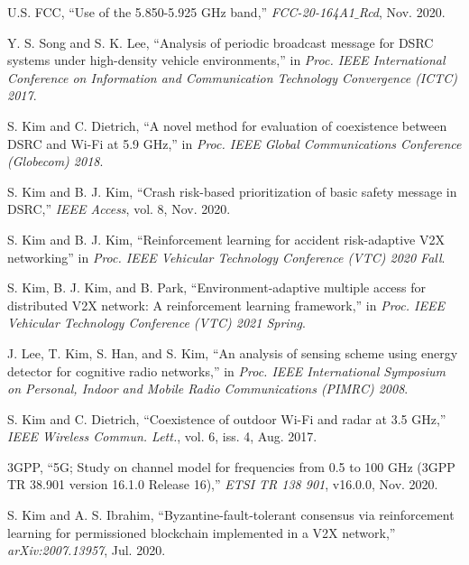 \documentclass[journal]{IEEEtran}
\begin{document}
\begin{thebibliography}{99}

\setlength{\parskip}{0.5em}
 U.S. FCC, ``Use of the 5.850-5.925 GHz band,'' \textit{FCC-20-164A1$\_$Rcd}, Nov. 2020.

 Y. S. Song and S. K. Lee, ``Analysis of periodic broadcast message for DSRC systems under high-density vehicle environments,'' in \textit{Proc. IEEE  International Conference on Information and Communication Technology Convergence (ICTC) 2017}.

 S. Kim and C. Dietrich, ``A novel method for evaluation of coexistence between DSRC and Wi-Fi at 5.9 GHz,'' in \textit{Proc. IEEE Global Communications Conference (Globecom) 2018}.

 S. Kim and B. J. Kim, ``Crash risk-based prioritization of basic safety message in DSRC,'' \textit{IEEE Access}, vol. 8, Nov. 2020.

 S. Kim and B. J. Kim, ``Reinforcement learning for accident risk-adaptive V2X networking'' in \textit{Proc. IEEE Vehicular Technology Conference (VTC) 2020 Fall}.

 S. Kim, B. J. Kim, and B. Park, ``Environment-adaptive multiple access for distributed V2X network: A reinforcement learning framework,'' in \textit{Proc. IEEE Vehicular Technology Conference (VTC) 2021 Spring}.

 J. Lee, T. Kim, S. Han, and S. Kim, ``An analysis of sensing scheme using energy detector for cognitive radio networks,'' in \textit{Proc. IEEE International Symposium on Personal, Indoor and Mobile Radio Communications (PIMRC) 2008}.

 S. Kim and C. Dietrich, ``Coexistence of outdoor Wi-Fi and radar at 3.5 GHz,'' \textit{IEEE Wireless Commun. Lett.}, vol. 6, iss. 4, Aug. 2017.

 3GPP, ``5G; Study on channel model for frequencies from 0.5 to 100 GHz (3GPP TR 38.901 version 16.1.0 Release 16),'' \textit{ETSI TR 138 901}, v16.0.0, Nov. 2020.

 S. Kim and A. S. Ibrahim, ``Byzantine-fault-tolerant consensus via reinforcement learning for permissioned blockchain implemented in a V2X network,'' \textit{arXiv:2007.13957}, Jul. 2020.

\end{thebibliography}
\end{document}
